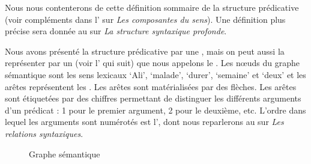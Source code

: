 Nous nous contenterons de cette définition sommaire de la structure prédicative (voir compléments dans l’ sur \textit{Les composantes du sens}). Une définition plus précise sera donnée au  sur \textit{La structure syntaxique profonde}.

Nous avons présenté la structure prédicative par une , mais on peut aussi la représenter par un  (voir l’ qui suit) que nous appelons le . Les nœuds du graphe sémantique sont les sens lexicaux ‘Ali’, ‘malade’, ‘durer’, ‘semaine’ et ‘deux’ et les arêtes représentent les . Les arêtes sont matérialisées par des flèches. Les arêtes sont étiquetées par des chiffres permettant de distinguer les différents arguments d’un prédicat : 1 pour le premier argument, 2 pour le deuxième, etc. L’ordre dans lequel les arguments sont numérotés est l’, dont nous reparlerons au  sur \textit{Les relations syntaxiques}.

\begin{figure}
\caption{\label{fig:Graphe sémantique}Graphe sémantique}
\end{figure}

